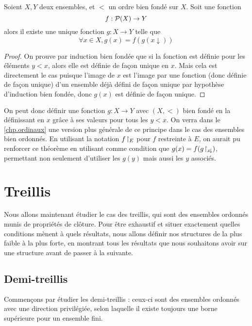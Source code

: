 \begin{theorem}\label{thm.recur.bf}
  Soient $X,Y$ deux ensembles, et $<$ un ordre bien fondé sur $X$. Soit
  une fonction
  \[f : \mathcal{P} (X) \to Y\]
  alors il existe une unique fonction $g : X \to Y$ telle que
  \[\forall x \in X, g(x) = f(g(x\!\downarrow))\]
\end{theorem}

\begin{proof}
  On prouve par induction bien fondée que si la fonction est définie pour les
  éléments $y < x$, alors elle est définie de façon unique en $x$. Mais cela
  est directement le cas puisque l'image de $x$ est l'image par une fonction
  (donc définie de façon unique) d'un ensemble déjà défini de façon unique par
  hypothèse d'induction bien fondée, donc $g(x)$ est définie de façon unique.
\end{proof}

On peut donc définir une fonction $g : X \to Y$ avec $(X,<)$ bien fondé en la
définissant en $x$ grâce à ses valeurs pour tous les $y < x$. On verra dans le
\cref{chp.ordinaux} une version plus générale de ce principe dans le cas des
ensembles bien ordonnés. En utilisant la notation $f\!\upharpoonright_{E}$ pour \og $f$
restreinte à $E$\fg, on aurait pu renforcer ce théorème en utilisant comme
condition que $g(x) = f(g\!\upharpoonright_{x\!\downarrow})$, permettant non seulement
d'utiliser les $g(y)$ mais aussi les $y$ associés.

\section{Treillis}

Nous allons maintenant étudier le cas des treillis, qui sont des ensembles
ordonnés munis de propriétés de clôture. Pour être exhaustif et situer
exactement quelles conditions mènent à quels résultats, nous allons définir nos
structures de la plus faible à la plus forte, en montrant tous les résultats que
nous souhaitons avoir sur une structure avant de passer à la suivante.

\subsection{Demi-treillis}

Commençons par étudier les demi-treillis : ceux-ci sont des ensembles ordonnés
avec une direction privilégiée, selon laquelle il existe toujours une borne
supérieure pour un ensemble fini.

